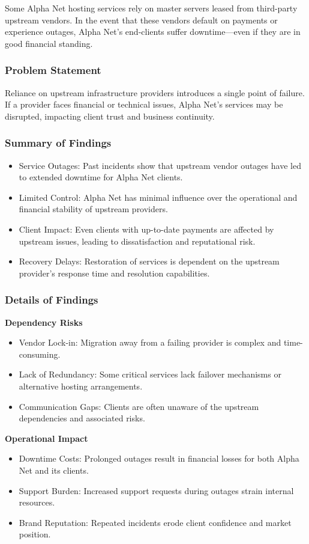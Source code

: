 Some Alpha Net hosting services rely on master servers leased from third-party upstream vendors. In the event that these vendors default on payments or experience outages, Alpha Net's end-clients suffer downtime—even if they are in good financial standing.

\subsubsection*{Problem Statement}
Reliance on upstream infrastructure providers introduces a single point of failure. If a provider faces financial or technical issues, Alpha Net's services may be disrupted, impacting client trust and business continuity.

\subsubsection*{Summary of Findings}
\begin{itemize}
    \item Service Outages: Past incidents show that upstream vendor outages have led to extended downtime for Alpha Net clients.
    \item Limited Control: Alpha Net has minimal influence over the operational and financial stability of upstream providers.
    \item Client Impact: Even clients with up-to-date payments are affected by upstream issues, leading to dissatisfaction and reputational risk.
    \item Recovery Delays: Restoration of services is dependent on the upstream provider's response time and resolution capabilities.
\end{itemize}

\subsubsection*{Details of Findings}
\textbf{Dependency Risks}
\begin{itemize}
    \item Vendor Lock-in: Migration away from a failing provider is complex and time-consuming.
    \item Lack of Redundancy: Some critical services lack failover mechanisms or alternative hosting arrangements.
    \item Communication Gaps: Clients are often unaware of the upstream dependencies and associated risks.
\end{itemize}
\textbf{Operational Impact}
\begin{itemize}
    \item Downtime Costs: Prolonged outages result in financial losses for both Alpha Net and its clients.
    \item Support Burden: Increased support requests during outages strain internal resources.
    \item Brand Reputation: Repeated incidents erode client confidence and market position.
\end{itemize}

